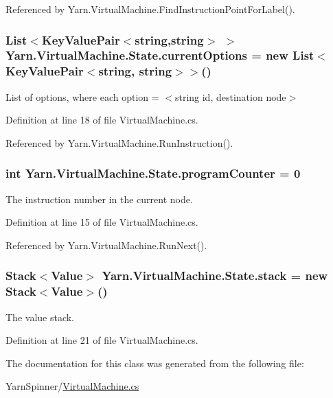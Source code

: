 Referenced by Yarn.\-Virtual\-Machine.\-Find\-Instruction\-Point\-For\-Label().

\hypertarget{a00159_ab816dfea32ecda23282700f01454e0a9}{
\subsubsection[{current\-Options}]{\setlength{\rightskip}{0pt plus 5cm}List$<$Key\-Value\-Pair$<$string,string$>$ $>$ Yarn.\-Virtual\-Machine.\-State.\-current\-Options = new List$<$Key\-Value\-Pair$<$string, string$>$$>$()}}\label{a00159_ab816dfea32ecda23282700f01454e0a9}


List of options, where each option = $<$string id, destination node$>$ 



Definition at line 18 of file Virtual\-Machine.\-cs.



Referenced by Yarn.\-Virtual\-Machine.\-Run\-Instruction().

\hypertarget{a00159_a2c76546b54b4fb573d7f14d79ce230a3}{
\subsubsection[{program\-Counter}]{\setlength{\rightskip}{0pt plus 5cm}int Yarn.\-Virtual\-Machine.\-State.\-program\-Counter = 0}}\label{a00159_a2c76546b54b4fb573d7f14d79ce230a3}


The instruction number in the current node. 



Definition at line 15 of file Virtual\-Machine.\-cs.



Referenced by Yarn.\-Virtual\-Machine.\-Run\-Next().

\hypertarget{a00159_a0bc84abf38b3ff31cbb47363b851c233}{
\subsubsection[{stack}]{\setlength{\rightskip}{0pt plus 5cm}Stack$<${\bf Value}$>$ Yarn.\-Virtual\-Machine.\-State.\-stack = new Stack$<${\bf Value}$>$()\hspace{0.3cm}{\ttfamily [private]}}}\label{a00159_a0bc84abf38b3ff31cbb47363b851c233}


The value stack. 



Definition at line 21 of file Virtual\-Machine.\-cs.



The documentation for this class was generated from the following file\-:\begin{DoxyCompactItemize}
\item 
Yarn\-Spinner/\hyperlink{a00304}{Virtual\-Machine.\-cs}\end{DoxyCompactItemize}
